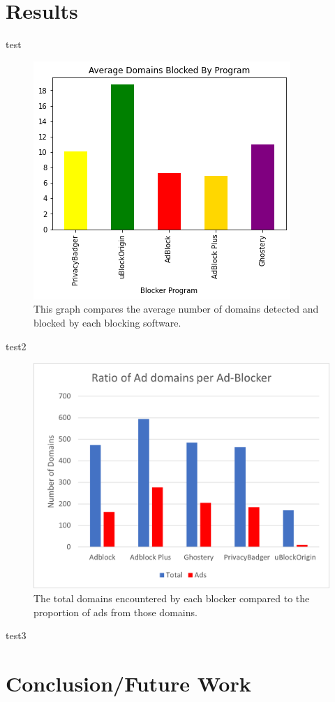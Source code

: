\documentclass[sigsmall]{acmart}
\begin{document}
\section*{Results}

test

\begin{figure}
  \includegraphics[width=\linewidth]{AvgByProgram.png}
  \caption{This graph compares the average number of domains detected and blocked by each blocking software.}
  \label{fig:graph1}
\end{figure}

test2

\begin{figure}
  \includegraphics[scale =1.5]{Ratio-of-Ad-domains-per-ad-blocker.png}
  \caption{The total domains encountered by each blocker compared to the proportion of ads from those domains.}
  \label{fig:graph2}
\end{figure}

test3


\section*{Conclusion/Future Work}




\end{document}
